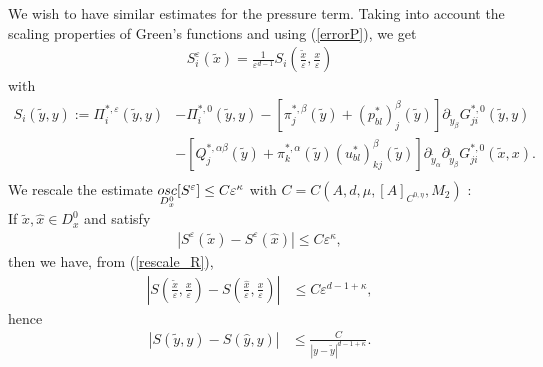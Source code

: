 \documentclass[11pt, reqno]{amsart}
\theoremstyle{definition}
\theoremstyle{remark}
\numberwithin{equation}{section}
\begin{document}
	\noindent We wish to have similar estimates for the pressure term.
	Taking into account the scaling properties of Green's functions and using (\ref{errorP}), we get 
	\begin{align}
		S_i^{\varepsilon} (\tilde{x})=	\frac{1}{\varepsilon^{d-1}} S_i\left(\frac{\tilde{x}}{\varepsilon},\frac{x}{\varepsilon} \right) \label{rescale_R}
	\end{align}
	with
	\begin{align*}
		S_i(\tilde{y},y):=	\Pi_i^{*,\varepsilon} (\tilde{y},y)&-  \Pi_i^{*,0} (\tilde{y},y)-[\pi^{*,\beta}_{j}(\tilde{y}) +(p^*_{bl})^{\beta}_{j} (\tilde{y})]\partial_{\tilde{y}_{\beta}} G_{ji}^{*,0}  (\tilde{y},y)\nonumber\\
		&	-[Q^{*,\alpha\beta}_{j}(\tilde{y})+ \pi^{*,\alpha}_{k}(\tilde{y})(u^*_{bl})^{\beta}_{kj}	(\tilde{y})]\partial_{\tilde{y}_\alpha} \partial_{\tilde{y}_\beta} G_{ji}^{*,0} (\tilde{x},x) .	\\	
	\end{align*}
\noindent We rescale the estimate $\underset{D_x^0}{\textup{osc}} [S^{\varepsilon}]\leq  C \varepsilon^\kappa$ with $ C=C(A, d, \mu, [A]_{C^{0,\eta}},M_2)$ :\\
	If $\tilde{x},\hat{x}\in D_x^0$ and satisfy 
	\begin{align*}
		|S^{\varepsilon} (\tilde{x})- S^{\varepsilon} (\hat{x}) |\leq C \varepsilon^\kappa,
	\end{align*}
	then	 we have, from (\ref{rescale_R}),
	\begin{align*}
		\left|S\left(\frac{\tilde{x}}{\varepsilon},\frac{x}{\varepsilon} \right)-  S \left(\frac{\hat{x}}{\varepsilon},\frac{x}{\varepsilon} \right)\right|  &\leq C \varepsilon^{d-1+\kappa} ,   
	\end{align*}
	hence
	\begin{align*}
		\left| S\left( \tilde{y},y\right)-  S\left( \hat{y},y\right) \right|  &\leq \frac{C}{|y-\tilde{y}|^{d-1+\kappa}}.  
	\end{align*}
	
\end{document}
